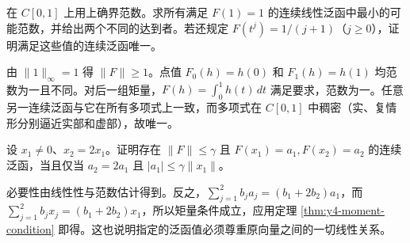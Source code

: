 \begin{exercise}
在 $C[0,1]$ 上用上确界范数。求所有满足 $F(1)=1$ 的连续线性泛函中最小的可能范数，并给出两个不同的达到者。若还规定 $F(t^j)=1/(j+1)$（$j\ge0$），证明满足这些值的连续泛函唯一。
\end{exercise}
\begin{solution}
由 $\|1\|_\infty=1$ 得 $\|F\|\ge1$。点值 $F_0(h)=h(0)$ 和 $F_1(h)=h(1)$ 均范数为一且不同。对后一组矩量，$F(h)=\int_0^1h(t)\,dt$ 满足要求，范数为一。任意另一连续泛函与它在所有多项式上一致，而多项式在 $C[0,1]$ 中稠密（实、复情形分别逼近实部和虚部），故唯一。
\end{solution}

\begin{exercise}
设 $x_1\ne0$、$x_2=2x_1$。证明存在 $\|F\|\le\gamma$ 且 $F(x_1)=a_1,F(x_2)=a_2$ 的连续泛函，当且仅当 $a_2=2a_1$ 且 $|a_1|\le\gamma\|x_1\|$。
\end{exercise}
\begin{solution}
必要性由线性性与范数估计得到。反之，$\sum_{j=1}^2b_ja_j=(b_1+2b_2)a_1$，而 $\sum_{j=1}^2b_jx_j=(b_1+2b_2)x_1$，所以矩量条件成立，应用定理 \ref{thm:y4-moment-condition} 即得。这也说明指定的泛函值必须尊重原向量之间的一切线性关系。
\end{solution}

